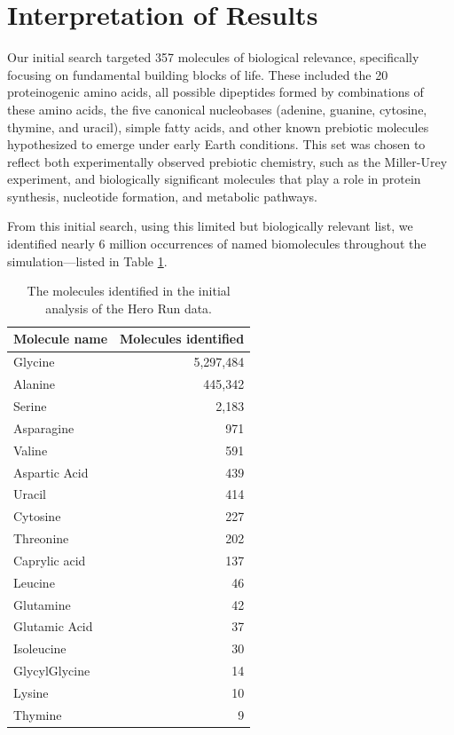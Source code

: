 \section{Interpretation of Results}
\label{sec:hero_run_interpretation}

Our initial search targeted 357 molecules of biological relevance, specifically focusing on fundamental building blocks of life. These included the 20 proteinogenic amino acids, all possible dipeptides formed by combinations of these amino acids, the five canonical nucleobases (adenine, guanine, cytosine, thymine, and uracil), simple fatty acids, and other known prebiotic molecules hypothesized to emerge under early Earth conditions. This set was chosen to reflect both experimentally observed prebiotic chemistry, such as the Miller-Urey experiment, and biologically significant molecules that play a role in protein synthesis, nucleotide formation, and metabolic pathways.

From this initial search, using this limited but biologically relevant list, we identified nearly 6 million occurrences of named biomolecules throughout the simulation---listed in Table \ref{tab:inital_molfind_counts}. 

\begin{table}[hb]
    \centering
    \begin{tabularx}{3in}{Xr}
        \toprule
        Molecule name & Molecules identified \\
        \midrule
        Glycine & 5,297,484 \\
        Alanine & 445,342 \\
        Serine & 2,183 \\
        Asparagine & 971 \\
        Valine & 591 \\
        Aspartic Acid & 439 \\
        Uracil & 414 \\
        Cytosine & 227 \\
        Threonine & 202 \\
        Caprylic acid & 137 \\
        Leucine & 46 \\
        Glutamine & 42 \\
        Glutamic Acid & 37 \\
        Isoleucine & 30 \\
        GlycylGlycine & 14 \\
        Lysine & 10 \\
        Thymine & 9 \\
        \bottomrule
    \end{tabularx}
    \caption[Initial Early Earth molfind search]{The molecules identified in the initial analysis of the Hero Run data.}
    \label{tab:inital_molfind_counts}
\end{table}

